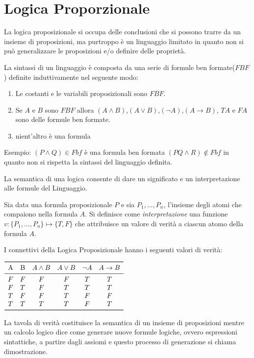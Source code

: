 \section{Logica Proporzionale}
La logica proposizionale si occupa delle conclusioni che si possono trarre da un insieme di proposizioni,
ma purtroppo è un linguaggio limitato in quanto non si può generalizzare le proposizioni e/o definire delle proprietà.

La sintassi di un linguaggio è composta da una serie di formule ben formate($FBF$) definite induttivamente nel seguente modo:
\begin{enumerate}
  \item Le costanti e le variabili proposizionali sono $FBF$.
  \item Se $A$ e $B$ sono $FBF$ allora $(A \land B)$,$(A \lor B)$,$(\neg A)$,$(A \rightarrow B)$,
        $TA$ e $FA$ sono delle formule ben formate.
  \item nient'altro è una formula
\end{enumerate}

Esempio:\newline
$(P \land Q) \in Fbf$  è una formula ben formata\newline
$(PQ \land R) \not \in Fbf$ in quanto non si rispetta la sintassi del linguaggio definita.\newline

La semantica di una logica consente di dare un significato e un interpretazione alle formule del Linguaggio.\newline
\begin{defi}
  Sia data una formula proposizionale $P$ e sia ${P_1,\dots,P_n}$, l'insieme degli atomi che compaiono nella formula $A$.\newline
  Si definisce come \emph{interpretazione} una funzione $v:\{P_1,\dots,P_n\} \mapsto \{T,F\}$ che attribuisce un valore di verità
  a ciascun atomo della formula $A$.
\end{defi}
I connettivi della Logica Proposizionale hanno i seguenti valori di verità:
\begin{table}
$\begin{array}{cccccc}
\toprule
\text{A} & \text{B} & A \land B & A \lor B & \neg A & A \rightarrow B\\
\midrule
    F & F & F & F & T & T\\
    F & T & F & T & T & T\\
    T & F & F & T & F & F\\
    T & T & T & T & F & T\\
\bottomrule
\end{array}$
\end{table}
La tavola di verità costituisce la semantica di un insieme di proposizioni mentre un calcolo logico dice come generare nuove formule logiche,
ovvero espressioni sintattiche, a partire dagli assiomi e questo processo di generazione si chiama dimostrazione.

